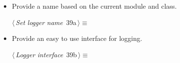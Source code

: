 \documentclass[
    a4paper,      %
    10pt,         %
    openright,    %
    notitlepage,  %
    parskip=half, %
]{scrreprt}       %
\theoremstyle{definition}                    %
\begin{document}
\begin{itemize}
  \item Provide a name based on the current module and class.
    \begin{flushleft} \small
\begin{minipage}{\linewidth}\label{scrap48}\raggedright\small
{} $\langle\,${\itshape Set logger name}\nobreak\ {\footnotesize {39a}}$\,\rangle\equiv$
\vspace{-1ex}
\vspace{-1.5ex}
\footnotesize
{}
\end{minipage}\vspace{4ex}
\end{flushleft}
\item Provide an easy to use interface for logging.
    \begin{flushleft} \small
\begin{minipage}{\linewidth}\label{scrap49}\raggedright\small
{} $\langle\,${\itshape Logger interface}\nobreak\ {\footnotesize {39b}}$\,\rangle\equiv$
\vspace{-1ex}
\vspace{-1.5ex}
\footnotesize
{}
\end{minipage}\vspace{4ex}
\end{flushleft}
\end{itemize}
\end{document}
